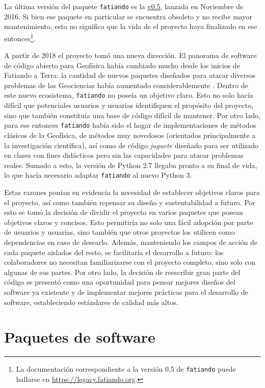 La última versión del paquete \texttt{fatiando} es la
\href{https://legacy.fatiando.org}{v0.5}, lanzada en Noviembre de
2016.
Si bien ese paquete en particular se encuentra obsoleto y no recibe mayor
mantenimiento, esto no significa que la vida de el proyecto haya finalizado en
ese entonces\footnote{La documentación correspondiente a la versión 0.5 de
\texttt{fatiando} puede hallarse en \url{https://legacy.fatiando.org}.}.

A partir de 2018 el proyecto tomó una nueva dirección.
El panorama de software de código abierto para Geofísica había cambiado mucho
desde los inicios de Fatiando a Terra: la cantidad de nuevos paquetes diseñados
para atacar diversos problemas de las Geociencias había aumentado
considerablemente
\citep{cockett2015, ruecker2017, varga2019, obspy2019}.
Dentro de este nuevo ecosistema, \texttt{fatiando} no poseía un objetivo claro.
Esto no solo hacía difícil que potenciales usuarios y usuarias identifiquen el
propósito del proyecto, sino que también constituía una base de código difícil
de mantener.
Por otro lado, para ese entonces \texttt{fatiando} había sido el hogar de
implementaciones de métodos clásicos de la Geofísica, de métodos muy novedosos
(orientados principalmente a la investigación científica), así como de código
\emph{juguete} diseñado para ser utilizado en clases con fines didácticos pero
sin las capacidades para atacar problemas reales.
Sumado a esto, la versión de Python 2.7 llegaba pronto a su final de vida, lo
que hacía necesario adaptar \texttt{fatiando} al nuevo Python 3.

Estas razones ponían en evidencia la necesidad de establecer objetivos claros
para el proyecto, así como también repensar su diseño y sustentabilidad
a futuro.
Por esto se tomó la decisión de dividir el proyecto en varios paquetes que
posean objetivos claros y concisos.
Esto permitiría no solo una fácil adopción por parte de usuarios y usuarias,
sino también que otros proyectos los utilicen como dependencias en caso de
desearlo.
Además, manteniendo los campos de acción de cada paquete aislados del resto,
se facilitaría el desarrollo a futuro: los colaboradores no necesitan
familiarizarse con el proyecto completo, sino solo con algunas de sus partes.
Por otro lado, la decisión de reescribir gran parte del código se presentó como
una oportunidad para pensar mejores diseños del software ya existente y de
implementar mejores
prácticas para el desarrollo de software, estableciendo estándares de calidad
más altos.


\section{Paquetes de software}


